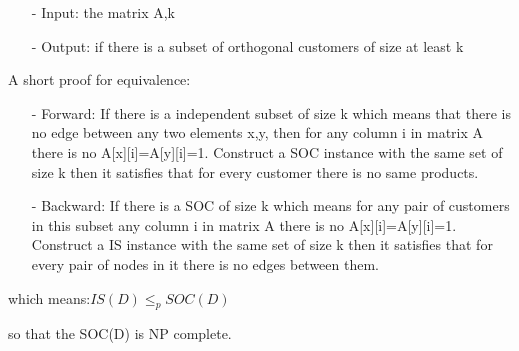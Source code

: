 \documentclass{article}
\begin{document}
\begin{itemize}
\item[-] Input: the matrix A,k
\item[-] Output: if there is a subset of orthogonal customers of size at least k
\end{itemize}
A short proof for equivalence:
\begin{itemize}
\item[-] Forward: If there is a independent subset of size k which means that there is no edge between any two elements x,y, then for any column i in matrix A there is no A[x][i]=A[y][i]=1. Construct a SOC instance with the same set of size k then it satisfies that for every customer there is no same products.
\item[-] Backward: If there is a SOC of size k which means for any pair of customers in this subset any column i in matrix A there is no A[x][i]=A[y][i]=1. Construct a IS instance with the same set of size k then it satisfies that for every pair of nodes in it there is no edges between them.
\end{itemize}
\centerline{which means:$IS(D){\le}_p SOC(D)$}
so that the SOC(D) is NP complete.



\clearpage
\end{document}
